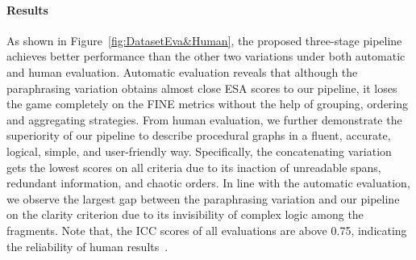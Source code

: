 

\paragraph{Results}

As shown in Figure~\ref{fig:DatasetEva&Human}, the proposed three-stage pipeline achieves better performance than the other two variations under both automatic and human evaluation. Automatic evaluation reveals that although the paraphrasing variation obtains almost close ESA scores to our pipeline, it loses the game completely on the FINE metrics without the help of grouping, ordering and aggregating strategies. From human evaluation, we further demonstrate the superiority of our pipeline to describe procedural graphs in a fluent, accurate, logical, simple, and user-friendly way. Specifically, the concatenating variation gets the lowest scores on all criteria due to its inaction of unreadable spans, redundant information, and chaotic orders. In line with the automatic evaluation, we observe the largest gap between the paraphrasing variation and our pipeline on the clarity criterion due to its invisibility of complex logic among the fragments. Note that, the ICC scores of all evaluations are above 0.75, indicating the reliability of human results~\cite{koo2016guideline}.
